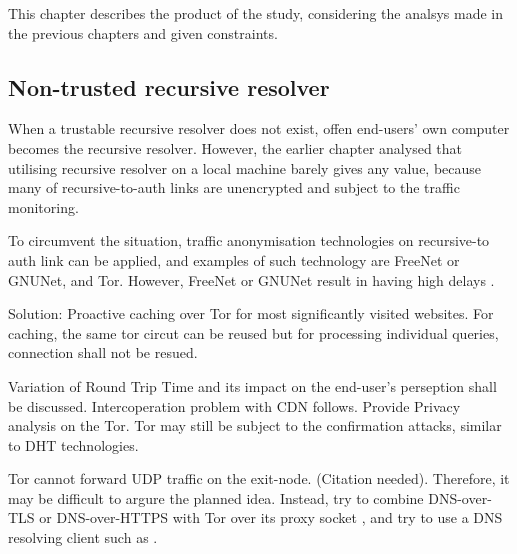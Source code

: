 This chapter describes the product of the study, considering the analsys made in the previous chapters and given constraints.

\subsection{Non-trusted recursive resolver}
When a trustable recursive resolver does not exist, offen end-users' own computer becomes the recursive resolver. However, the earlier chapter analysed that utilising recursive resolver on a local machine barely gives any value, because many of recursive-to-auth links are unencrypted and subject to the traffic monitoring.

To circumvent the situation, traffic anonymisation technologies on recursive-to auth link can be applied, and examples of such technology are  FreeNet \cite{clarke2001freenet} or GNUNet\cite{grothoff2017gnunet}, and Tor.
However, FreeNet \cite{clarke2001freenet} or GNUNet \cite{grothoff2017gnunet} result in having high delays \cite{anonymousoverdns}.

Solution: Proactive caching \cite{cohen2003proactive} over Tor for most significantly visited websites. For caching, the same tor circut can be reused but for processing individual queries, connection shall not be resued.

Variation of Round Trip Time and its impact on the end-user's perseption shall be discussed. Intercoperation problem with CDN follows.
Provide Privacy analysis on the Tor. Tor may still be subject to the confirmation attacks, similar to DHT technologies. 

Tor cannot forward UDP traffic on the exit-node. (Citation needed). Therefore, it may be difficult to argure the planned idea.
Instead, try to combine DNS-over-TLS or DNS-over-HTTPS with Tor over its proxy socket \cite{tor-socks}, and try to use a DNS resolving client such as \cite{technitium-configuration}. 